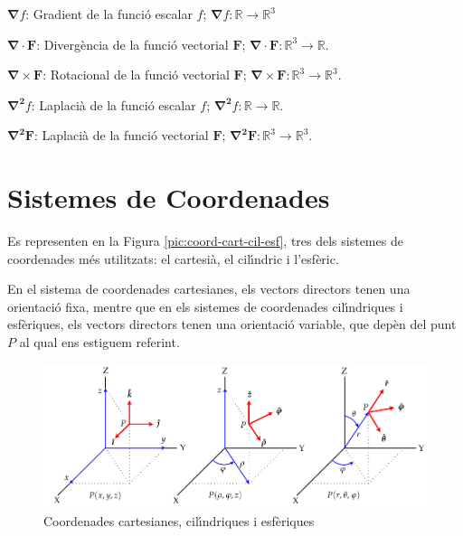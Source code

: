 \documentclass[catalan,a4paper,twoside,11pt]{article}
\begin{document}
\begin{list}{}
   \item[$\boldsymbol{\nabla}f$:] Gradient de la funci\'{o} escalar $f$;
   $\boldsymbol{\nabla}f:\mathbb{R}\rightarrow\mathbb{R}^3$
   \item[$\boldsymbol{\nabla\cdot F}$:] Diverg\`{e}ncia de la funci\'{o} vectorial $\boldsymbol{F}$;
   $\boldsymbol{\nabla\cdot F}: \mathbb{R}^3\rightarrow\mathbb{R}$.
   \item[$\boldsymbol{\nabla\times F}$:] Rotacional de la funci\'{o} vectorial $\boldsymbol{F}$;
   $\boldsymbol{\nabla\times F}:
   \mathbb{R}^3\rightarrow\mathbb{R}^3$.
   \item[$\boldsymbol{\nabla^2}f$:] Laplaci\`{a} de la funci\'{o} escalar $f$;
   $\boldsymbol{\nabla^2}f: \mathbb{R}\rightarrow\mathbb{R}$.
   \item[$\boldsymbol{\nabla^2F}$:] Laplaci\`{a} de la funci\'{o} vectorial $\boldsymbol{F}$; $\boldsymbol{\nabla^2F}: \mathbb{R}^3\rightarrow\mathbb{R}^3$.
\end{list}

\newcommand{\va}{\ensuremath{\,\boldsymbol{\hat{\imath}}}}
\newcommand{\vb}{\ensuremath{\,\boldsymbol{\hat{\jmath}}}}
\newcommand{\vc}{\ensuremath{\,\boldsymbol{\hat{k}}}}
\section{Sistemes de Coordenades}

Es representen en la Figura \vref{pic:coord-cart-cil-esf}, tres dels
sistemes de coordenades m\'{e}s utilitzats: el cartesi\`{a}, el
cil\'{\i}ndric i l'esf\`{e}ric.

En el sistema de coordenades cartesianes, els vectors directors
tenen una orientaci\'{o} fixa, mentre que en els sistemes de
coordenades cil\'{\i}ndriques i esf\`{e}riques, els vectors
directors tenen una orientaci\'{o} variable, que dep\`{e}n del punt
$P$ al qual ens estiguem referint.

\begin{figure}[h]
\centering
   \includegraphics{Imatges/Coordenades.pdf}
\caption{Coordenades cartesianes, cil\'{\i}ndriques i esf\`{e}riques}
\label{pic:coord-cart-cil-esf}
\end{figure}
\end{document}
